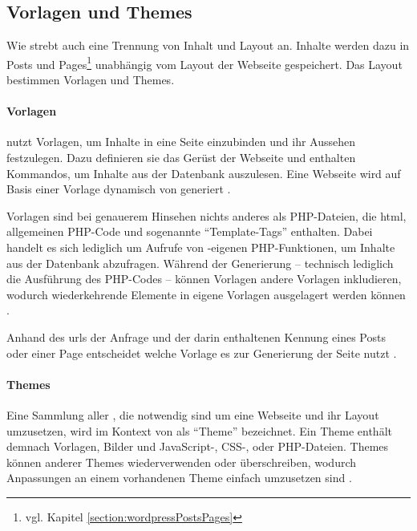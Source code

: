     \subsection{Vorlagen und Themes}
        \label{section:wordpressTemplatesThemes}
        Wie {\imperia} strebt auch {\wordpress} eine Trennung von
        Inhalt und Layout an.
        Inhalte werden dazu in
        Posts und Pages\footnote{vgl. Kapitel \ref{section:wordpressPostsPages}}
        unabhängig vom Layout der Webseite gespeichert.
        Das Layout bestimmen Vorlagen und Themes.

        \paragraph*{Vorlagen}
        {\wordpress} nutzt Vorlagen, um Inhalte in eine Seite einzubinden
        und ihr Aussehen festzulegen.
        Dazu definieren sie das Gerüst der Webseite und enthalten Kommandos,
        um Inhalte aus der Datenbank auszulesen.
        Eine Webseite wird auf Basis einer Vorlage dynamisch von {\wordpress} generiert
        \cite{wordpress:Templates}.

        Vorlagen sind bei genauerem Hinsehen nichts anderes als PHP-Dateien,
        die \gls{html}, allgemeinen PHP-Code und sogenannte
        "`Template-Tags"' enthalten.
        Dabei handelt es sich lediglich um Aufrufe von
        {\wordpress}-eigenen PHP-Funktionen,
        um Inhalte aus der Datenbank abzufragen.
        Während der Generierung -- technisch lediglich die Ausführung
        des PHP-Codes -- können Vorlagen andere Vorlagen inkludieren,
        wodurch wiederkehrende Elemente in eigene Vorlagen ausgelagert
        werden können \cite{wordpress:TemplateFiles}.

        Anhand des \glspl{url} der Anfrage und der darin enthaltenen
        Kennung eines Posts oder einer Page
        entscheidet {\wordpress} welche Vorlage es zur Generierung der Seite nutzt
        \cite{wordpress:TemplateHierarchy}.

        \paragraph*{Themes}
        Eine Sammlung aller {\resources}, die notwendig sind um
        eine Webseite und ihr Layout umzusetzen,
        wird im Kontext von {\wordpress} als "`Theme"' bezeichnet.
        Ein Theme enthält demnach Vorlagen, Bilder und
        JavaScript-, CSS-, oder PHP-Dateien.
        Themes können {\resources} anderer Themes wiederverwenden oder überschreiben,
        wodurch Anpassungen an einem vorhandenen Theme einfach umzusetzen sind
        \cite{wordpress:Themes}.

